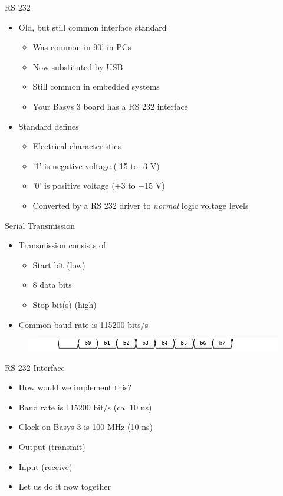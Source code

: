 \begin{frame}[fragile]{RS 232}
\begin{itemize}
\item Old, but still common interface standard
\begin{itemize}
\item Was common in 90' in PCs
\item Now substituted by USB
\item Still common in embedded systems
\item Your Basys 3 board has a RS 232 interface
\end{itemize}
\item Standard defines
\begin{itemize}
\item Electrical characteristics
\item '1' is negative voltage (-15 to -3 V)
\item '0' is positive voltage (+3 to +15 V)
\item Converted by a RS 232 driver to \emph{normal} logic voltage levels
\end{itemize}
\end{itemize}
\end{frame}


\begin{frame}[fragile]{Serial Transmission}
\begin{itemize}
\item Transmission consists of
\begin{itemize}
\item Start bit (low)
\item 8 data bits
\item Stop bit(s) (high)
\end{itemize}
\item Common baud rate is 115200 bits/s
\end{itemize}
\begin{figure}
  \includegraphics[scale=0.8]{../figures/uart_wave}
\end{figure}
\end{frame}

\begin{frame}[fragile]{RS 232 Interface}
\begin{itemize}
\item How would we implement this?
\item Baud  rate is 115200 bit/s (ca. 10 us)
\item Clock on Basys 3 is 100 MHz (10 ns)
\item Output (transmit)
\item Input (receive)
\item Let us do it now together
\end{itemize}
\end{frame}

